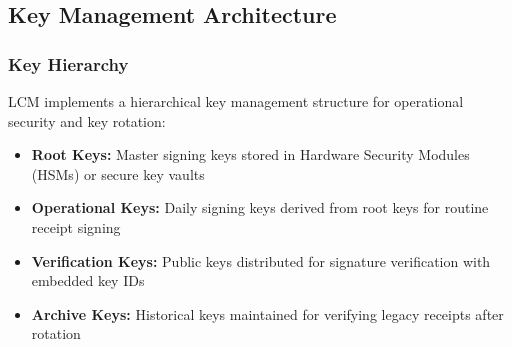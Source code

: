 \documentclass[12pt,a4paper]{article}
\begin{document}
\subsection{Key Management Architecture}

\subsubsection{Key Hierarchy}

LCM implements a hierarchical key management structure for operational security and key rotation:

\begin{itemize}
\item \textbf{Root Keys:} Master signing keys stored in Hardware Security Modules (HSMs) or secure key vaults
\item \textbf{Operational Keys:} Daily signing keys derived from root keys for routine receipt signing
\item \textbf{Verification Keys:} Public keys distributed for signature verification with embedded key IDs
\item \textbf{Archive Keys:} Historical keys maintained for verifying legacy receipts after rotation
\end{itemize}
\end{document}
